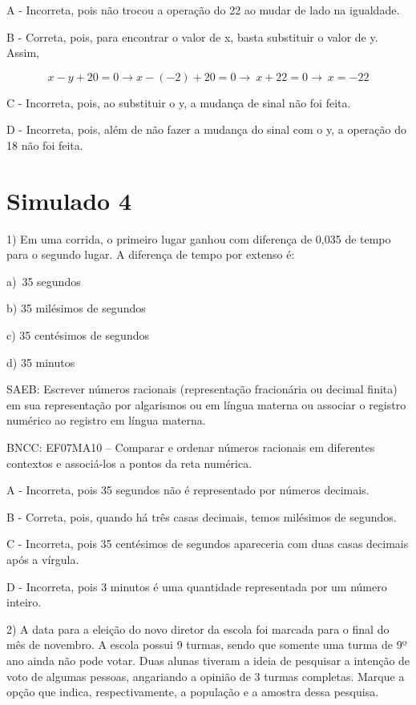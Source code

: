 A - Incorreta, pois não trocou a operação do 22 ao mudar de lado na
igualdade.

B - Correta, pois, para encontrar o valor de x, basta substituir o valor
de y. Assim,

\[x - y + 20 = 0 \rightarrow x - ( - 2) + 20 = 0 \rightarrow \ x + 22 = 0 \rightarrow \ x = - 22\]

C - Incorreta, pois, ao substituir o y, a mudança de sinal não foi
feita.

D - Incorreta, pois, além de não fazer a mudança do sinal com o y, a
operação do 18 não foi feita.

\hypertarget{simulado-4}{%
\section{Simulado 4}\label{simulado-4}}

1) Em uma corrida, o primeiro lugar ganhou com diferença de 0,035 de
tempo para o segundo lugar. A diferença de tempo por extenso é:

a)~35 segundos

b) 35 milésimos de segundos

c) 35 centésimos de segundos~

d) 35 minutos

SAEB: Escrever números racionais (representação fracionária ou decimal
finita) em sua representação por algarismos ou em língua materna ou
associar o registro numérico ao registro em língua materna.

BNCC: EF07MA10 -- Comparar e ordenar números racionais em diferentes
contextos e associá-los a pontos da reta numérica.

A - Incorreta, pois 35 segundos não é representado por números decimais.

B - Correta, pois, quando há três casas decimais, temos milésimos de
segundos.

C - Incorreta, pois 35 centésimos de segundos apareceria com duas casas
decimais após a vírgula.

D - Incorreta, pois 3 minutos é uma quantidade representada por um
número inteiro.

2) A data para a eleição do novo diretor da escola foi marcada para o
final do mês de novembro. A escola possui 9 turmas, sendo que somente
uma turma de 9º ano ainda não pode votar. Duas alunas tiveram a ideia de
pesquisar a intenção de voto de algumas pessoas, angariando a opinião de
3 turmas completas. Marque a opção que indica, respectivamente, a
população e a amostra dessa pesquisa.~

